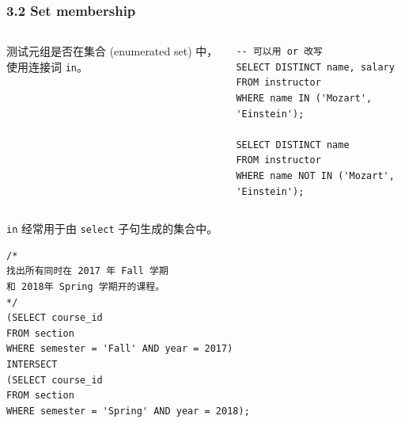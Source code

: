 \documentclass[aspectratio=169, 14pt]{beamer}
\begin{document}
\begin{frame}[fragile]
    \frametitle{3.2 Set membership}
    \begin{columns}

    测试元组是否在集合 (enumerated set) 中，使用连接词 \texttt{in}。

    \begin{verbatim}
-- 可以用 or 改写
SELECT DISTINCT name, salary
FROM instructor
WHERE name IN ('Mozart', 'Einstein');

SELECT DISTINCT name
FROM instructor
WHERE name NOT IN ('Mozart', 'Einstein');
    \end{verbatim}

    \end{columns}

\end{frame}

\begin{frame}[fragile]
\texttt{in} 经常用于由 \texttt{select} 子句生成的集合中。

\begin{verbatim}
/*
找出所有同时在 2017 年 Fall 学期
和 2018年 Spring 学期开的课程。
*/
(SELECT course_id
FROM section
WHERE semester = 'Fall' AND year = 2017)
INTERSECT
(SELECT course_id
FROM section
WHERE semester = 'Spring' AND year = 2018);
\end{verbatim}

\end{frame}
\end{document}
